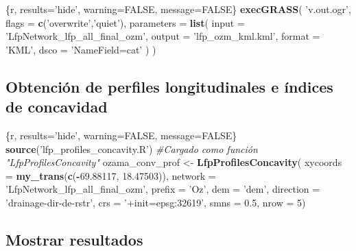 \documentclass[11pt,]{article}
\newenvironment{Shaded}{\begin{snugshade}}{\end{snugshade}}
\newcommand{\KeywordTok}[1]{\textcolor[rgb]{0.13,0.29,0.53}{\textbf{#1}}}
\newcommand{\DataTypeTok}[1]{\textcolor[rgb]{0.13,0.29,0.53}{#1}}
\newcommand{\DecValTok}[1]{\textcolor[rgb]{0.00,0.00,0.81}{#1}}
\newcommand{\FloatTok}[1]{\textcolor[rgb]{0.00,0.00,0.81}{#1}}
\newcommand{\StringTok}[1]{\textcolor[rgb]{0.31,0.60,0.02}{#1}}
\newcommand{\CommentTok}[1]{\textcolor[rgb]{0.56,0.35,0.01}{\textit{#1}}}
\newcommand{\OtherTok}[1]{\textcolor[rgb]{0.56,0.35,0.01}{#1}}
\newcommand{\OperatorTok}[1]{\textcolor[rgb]{0.81,0.36,0.00}{\textbf{#1}}}
\newcommand{\NormalTok}[1]{#1}
\begin{document}
\begin{Shaded}
\begin{Highlighting}[]
\NormalTok{   \{r, results=}\StringTok{'hide'}\NormalTok{, warning=}\OtherTok{FALSE}\NormalTok{, message=}\OtherTok{FALSE}\NormalTok{\}}
\KeywordTok{execGRASS}\NormalTok{(}
  \StringTok{'v.out.ogr'}\NormalTok{,}
  \DataTypeTok{flags =} \KeywordTok{c}\NormalTok{(}\StringTok{'overwrite'}\NormalTok{,}\StringTok{'quiet'}\NormalTok{),}
  \DataTypeTok{parameters =} \KeywordTok{list}\NormalTok{(}
    \DataTypeTok{input =} \StringTok{'LfpNetwork_lfp_all_final_ozm'}\NormalTok{,}
    \DataTypeTok{output =} \StringTok{'lfp_ozm_kml.kml'}\NormalTok{,}
    \DataTypeTok{format =} \StringTok{'KML'}\NormalTok{,}
    \DataTypeTok{dsco =} \StringTok{'NameField=cat'}
\NormalTok{  )}
\NormalTok{)}
\end{Highlighting}
\end{Shaded}

\subsection{Obtención de perfiles longitudinales e índices de
concavidad}\label{obtenciuxf3n-de-perfiles-longitudinales-e-uxedndices-de-concavidad}

\begin{Shaded}
\begin{Highlighting}[]
\NormalTok{   \{r, results=}\StringTok{'hide'}\NormalTok{, warning=}\OtherTok{FALSE}\NormalTok{, message=}\OtherTok{FALSE}\NormalTok{\}}
\KeywordTok{source}\NormalTok{(}\StringTok{'lfp_profiles_concavity.R'}\NormalTok{) }\CommentTok{#Cargado como función "LfpProfilesConcavity"}
\NormalTok{ozama_conv_prof <-}\StringTok{ }\KeywordTok{LfpProfilesConcavity}\NormalTok{(}
  \DataTypeTok{xycoords =} \KeywordTok{my_trans}\NormalTok{(}\KeywordTok{c}\NormalTok{(}\OperatorTok{-}\FloatTok{69.88117}\NormalTok{, }\FloatTok{18.47503}\NormalTok{)),}
  \DataTypeTok{network =} \StringTok{'LfpNetwork_lfp_all_final_ozm'}\NormalTok{,}
  \DataTypeTok{prefix =} \StringTok{'Oz'}\NormalTok{,}
  \DataTypeTok{dem =} \StringTok{'dem'}\NormalTok{,}
  \DataTypeTok{direction =} \StringTok{'drainage-dir-de-rstr'}\NormalTok{,}
  \DataTypeTok{crs =} \StringTok{'+init=epsg:32619'}\NormalTok{,}
  \DataTypeTok{smns =} \FloatTok{0.5}\NormalTok{,}
  \DataTypeTok{nrow =} \DecValTok{5}\NormalTok{)}
\end{Highlighting}
\end{Shaded}

\subsection{Mostrar resultados}\label{mostrar-resultados}
\end{document}
